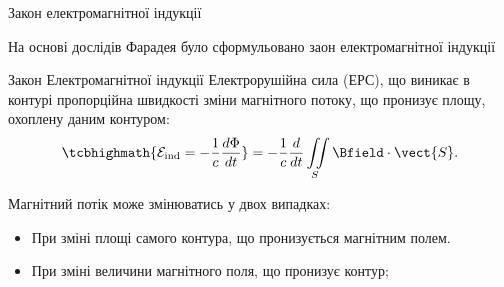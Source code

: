 \documentclass[onlytextwidth]{beamer}
\begin{document}
\begin{frame}{Закон електромагнітної індукції}{}
	\begin{block}{}
		На основі дослідів Фарадея було сформульовано заон електромагнітної індукції
	\end{block}
	\begin{block}{Закон Електромагнітної індукції}\justifying
		Електрорушійна сила (ЕРС), що виникає в контурі пропорційна швидкості зміни магнітного потоку, що пронизує площу, охоплену даним контуром:
		\begin{equation*}
			\tcbhighmath{\mathcal{E}_\text{ind} =  -\frac1c \frac{d\Phi}{dt}} = -\frac1c \frac{d}{dt} \iint\limits_S \Bfield\cdot\vect{S}.
		\end{equation*}
	\end{block}
	\begin{block}{}
		Магнітний потік може змінюватись  у двох випадках:
		\begin{itemize}
			\item При зміні площі самого контура, що пронизується магнітним полем.
			\item При зміні величини магнітного поля, що пронизує контур;
		\end{itemize}
	\end{block}
\end{frame}
\end{document}
